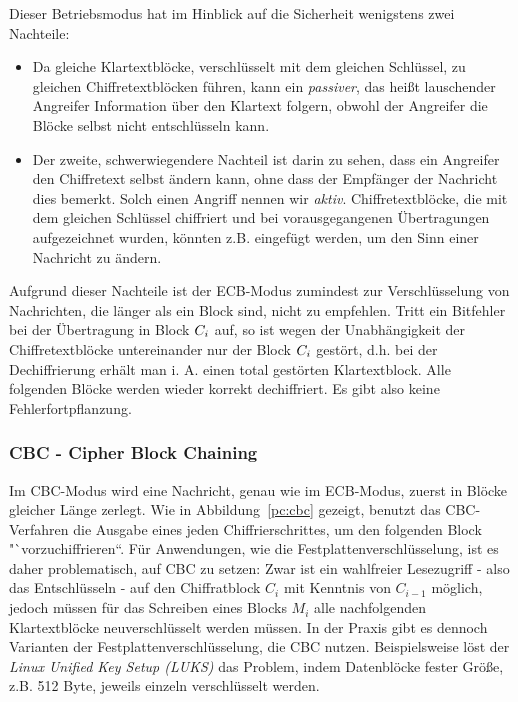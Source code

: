 Dieser Betriebsmodus hat im Hinblick auf die Sicherheit wenigstens zwei Nachteile:
\begin{itemize}
	\item Da gleiche Klartextblöcke, verschlüsselt mit dem gleichen Schlüssel, zu gleichen Chiffretextblöcken führen, kann ein \emph{passiver}, das heißt lauschender Angreifer
	Information über den Klartext folgern, obwohl der Angreifer die Blöcke selbst nicht entschlüsseln kann.
	\item Der zweite, schwerwiegendere Nachteil ist darin zu sehen, dass ein Angreifer den Chiffretext selbst ändern kann, ohne dass der Empfänger der
	Nachricht dies bemerkt. Solch einen Angriff nennen wir \emph{aktiv}. Chiffretextblöcke, die mit dem gleichen Schlüssel chiffriert und bei vorausgegangenen Übertragungen aufgezeichnet wurden, könnten
	z.B. eingefügt werden, um den Sinn einer Nachricht zu ändern.
\end{itemize}

Aufgrund dieser Nachteile ist der ECB-Modus zumindest zur Verschlüsselung von Nachrichten, die länger als ein Block sind, nicht zu empfehlen.
Tritt ein Bitfehler bei der Übertragung in Block $C_i$ auf, so ist wegen der Unabhängigkeit der Chiffretextblöcke untereinander nur der Block
$C_i$ gestört, d.h. bei der Dechiffrierung erhält man i. A. einen total gestörten Klartextblock. Alle folgenden Blöcke werden wieder korrekt
dechiffriert. Es gibt also keine Fehlerfortpflanzung.

\subsubsection{CBC - Cipher Block Chaining}\label{ssec:cbc}
Im CBC-Modus wird eine Nachricht, genau wie im ECB-Modus, zuerst in Blöcke gleicher Länge zerlegt. Wie in Abbildung~\ref{pc:cbc} gezeigt, benutzt das CBC-Verfahren die Ausgabe eines jeden Chiffrierschrittes, um den folgenden Block "`vorzuchiffrieren``.
Für Anwendungen, wie die Festplattenverschlüsselung, ist es daher problematisch, auf CBC zu setzen: Zwar ist ein wahlfreier Lesezugriff - also das Entschlüsseln - auf den Chiffratblock $C_i$ mit Kenntnis von $C_{i-1}$ möglich, jedoch müssen für das Schreiben eines Blocks $M_i$ alle nachfolgenden Klartextblöcke neuverschlüsselt werden müssen. In der Praxis gibt es dennoch Varianten der Festplattenverschlüsselung, die CBC nutzen.
Beispielsweise löst der \textit{Linux Unified Key Setup (LUKS)} das Problem, indem Datenblöcke fester Größe, z.B. 512 Byte, jeweils einzeln verschlüsselt werden.

